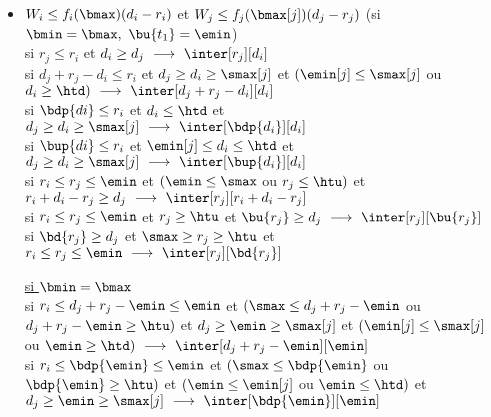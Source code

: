 \documentclass{report}
\begin{document}
\begin{itemize}
\item $W_i\le f_i(\bmax)(d_i-r_i)$ et $W_j\le f_j(\bmax[j])(d_j-r_j)$ 
  (si $\bmin=\bmax,\ \bu{t_1}=\emin$)\\
  \vspace{0.2cm}
  si $r_j \le r_i$ et $ d_i \ge d_j\ \longrightarrow\ \inter[r_j][d_i]$\\
  \vspace{0.1cm}
  si $d_j+r_j-d_i \le r_i$ et $d_j \ge d_i \ge \smax[j]$ et 
  $(\emin[j] \le \smax[j]$ ou $d_i \ge \htd)\ \longrightarrow\ 
  \inter[d_j+r_j-d_i][d_i]$\\
  \vspace{0.1cm}
  si $\bdp{di} \le r_i$ et $d_i \le \htd$ et 
  $d_j \ge d_i \ge \smax[j]\ \longrightarrow\ \inter[\bdp{d_i}][d_i]$\\
  \vspace{0.1cm}
  si $\bup{di} \le r_i$ et $\emin[j] \le d_i \le \htd$ et 
  $d_j \ge d_i \ge \smax[j]\ \longrightarrow\ \inter[\bup{d_i}][d_i]$\\
  \vspace{0.1cm}
  si $r_i \le r_j \le \emin$ et $(\emin \le \smax$ ou $r_j\le \htu)$ et 
  $r_i+d_i-r_j \ge d_j\ \longrightarrow\ \inter[r_j][r_i+d_i-r_j]$\\
  \vspace{0.1cm}
  si $r_i \le r_j \le \emin$ et $ r_j \ge \htu$ et 
  $\bu{r_j} \ge d_j\ \longrightarrow\ \inter[r_j][\bu{r_j}]$\\
  \vspace{0.1cm}
  si $\bd{r_j} \ge d_j$ et $\smax \ge r_j \ge \htu$ et 
  $r_i \le r_j \le \emin\ \longrightarrow\ \inter[r_j][\bd{r_j}]$\\
  \vspace{0.25cm}

  \underline{si $\bmin=\bmax$}\\
  \vspace{0.2cm}
  si $r_i \le d_j+r_j-\emin \le \emin$ et 
  $(\smax \le d_j+r_j-\emin$ ou $d_j+r_j-\emin \ge \htu)$ et 
  $d_j \ge \emin \ge \smax[j]$ et \linebreak $(\emin[j] \le \smax[j]$ ou 
  $\emin \ge \htd)\ \longrightarrow\ \inter[d_j+r_j-\emin][\emin]$\\
  \vspace{0.1cm}
  si $r_i \le \bdp{\emin} \le \emin$ et  
  $(\smax \le \bdp{\emin}$ ou $\bdp{\emin} \ge \htu)$ et 
  $(\emin \le \emin[j]$ ou $\emin \le \htd)$ et \linebreak 
  $d_j \ge \emin \ge \smax[j]\ 
  \longrightarrow\   \inter[\bdp{\emin}][\emin]$\\
  \vspace{0.25cm}


\end{itemize}
\end{document}
